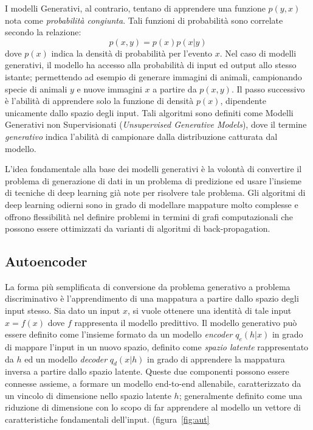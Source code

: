 I modelli Generativi, al contrario, tentano di apprendere una funzione $p(y,x)$ nota come \textit{probabilità congiunta}. Tali funzioni di probabilità sono correlate secondo la relazione: 
\[p(x,y)=p(x)p(x|y)\]
dove $p(x)$ indica la densità di probabilità per l'evento $x$. 
Nel caso di modelli generativi, il modello ha accesso alla probabilità di input ed output allo stesso istante; permettendo ad esempio di generare immagini di animali, campionando specie di animali $y$ e nuove immagini $x$ a partire da $p(x,y)$.
Il passo successivo è l'abilità di apprendere solo la funzione di densità $p(x)$, dipendente unicamente dallo spazio degli input. Tali algoritmi sono definiti come Modelli Generativi non Supervisionati (\textit{Unsupervised Generative Models}), dove il termine \textit{generativo} indica l'abilità di campionare dalla distribuzione catturata dal modello. 

L'idea fondamentale alla base dei modelli generativi è la volontà di convertire il problema di generazione di dati in un problema di predizione ed usare l'insieme di tecniche di deep learning già note per risolvere tale problema. Gli algoritmi di deep learning odierni sono in grado di modellare mappature molto complesse e offrono flessibilità nel definire problemi in termini di grafi computazionali che possono essere ottimizzati da varianti di algoritmi di back-propagation.

\subsection{Autoencoder}
La forma più semplificata di conversione da problema generativo a problema discriminativo è l'apprendimento di una mappatura a partire dallo spazio degli input stesso. Sia dato un input $x$, si vuole ottenere una identità di tale input $x=f(x)$ dove $f$ rappresenta il modello predittivo. Il modello generativo può essere definito come l'insieme formato da un modello \textit{encoder} $q_e(h|x)$ in grado di mappare l'input in un nuovo spazio, definito come \textit{spazio latente} rappresentato da $h$ ed un modello \textit{decoder} $q_d(x|h)$ in grado di apprendere la mappatura inversa a partire dallo spazio latente.
Queste due componenti possono essere connesse assieme, a formare un modello end-to-end allenabile, caratterizzato da un vincolo di dimensione nello spazio latente $h$; generalmente definito come una riduzione di dimensione con lo scopo di far apprendere al modello un vettore di caratteristiche fondamentali dell'input. (figura~\ref{fig:aut}

